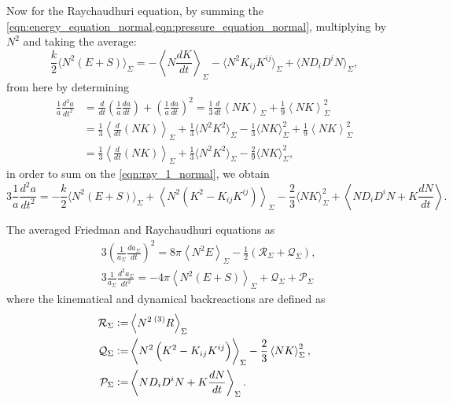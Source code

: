 Now for the Raychaudhuri equation, by summing the \cref{eqn:energy_equation_normal,eqn:pressure_equation_normal}, multiplying by $N^2$ and taking the average:
\begin{equation}
    \frac{k}{2}\langle N^2(E+S)\rangle_\Sigma=-\left\langle N\frac{dK}{dt}\right\rangle_\Sigma-\langle N^2K_{ij}K^{ij}\rangle_\Sigma+\langle ND_iD^iN\rangle_\Sigma,
    \label{eqn:ray_1_normal}
\end{equation}
from here by determining
\begin{align}
    \frac{1}{a}\frac{d^2a}{dt^2}&=\frac{d}{dt}\left(\frac{1}{a}\frac{da}{dt}\right)+\left(\frac{1}{a}\frac{da}{dt}\right)^2=\frac{1}{3}\frac{d}{dt}\left\langle NK \right\rangle_{\Sigma}+\frac{1}{9}\left\langle NK \right\rangle_{\Sigma}^2\nonumber\\
    &=\frac{1}{3}\left\langle \frac{d}{dt}(NK) \right\rangle_{\Sigma}+\frac{1}{3}\langle N^2K^2\rangle_{\Sigma}-\frac{1}{3}\langle NK\rangle^2_\Sigma+\frac{1}{9}\left\langle NK \right\rangle_{\Sigma}^2\nonumber\\
    &=\frac{1}{3}\left\langle \frac{d}{dt}(NK) \right\rangle_{\Sigma}+\frac{1}{3}\langle N^2K^2\rangle_{\Sigma}-\frac{2}{9}\langle NK\rangle^2_\Sigma,
    \label{eqn:useful_51}
\end{align}
in order to sum on the \cref{eqn:ray_1_normal}, we obtain
\begin{equation}
    3\frac{1}{a}\frac{d^2a}{dt^2}=-\frac{k}{2}\langle N^2(E+S)\rangle_\Sigma+\left\langle N^2(K^2-K_{ij}K^{ij})\right\rangle_{\Sigma}-\frac{2}{3}\langle NK\rangle^2_\Sigma+\left\langle ND_iD^i N+K\frac{dN}{dt}\right\rangle.\nonumber
\end{equation}

The averaged Friedman and Raychaudhuri equations as
\begin{align}
    &3\left(\frac{1}{a_\Sigma}\frac{da_\Sigma}{dt}\right)^2=8\pi\left\langle N^2E\right\rangle_{\Sigma}-\frac{1}{2}\left(\mathcal{R}_\Sigma+\mathcal{Q}_{\Sigma}\right),\label{eqn:friedman_eqs_jf_1_normal}\\
    &3\frac{1}{a_{\Sigma}}\frac{d^2a_{\Sigma}}{dt^2}=-4\pi\left\langle N^2(E+S)\right\rangle_{\Sigma}+\mathcal{Q}_{\Sigma}+\mathcal{P}_{\Sigma}\label{eqn:raychaud_eqs_jf_1_normal}
\end{align}
where the kinematical and dynamical backreactions are defined as
\begin{align}
    \mathcal{R}_\Sigma :=&\left\langle N^2 \prescript{(3)}{}{R}\right\rangle_{\Sigma}\\
    \mathcal{Q}_{\Sigma}:=& \left\langle N^2\left(K^2-K_{ij}K^{ij}\right)\right\rangle_{\Sigma}-\frac{2}{3}\left\langle NK\right\rangle_{\Sigma}^2, \\
    \mathcal{P}_{\Sigma}:= &\left\langle N D_i D^i N+K\frac{dN}{dt}\right\rangle_{\Sigma}.
\end{align}


